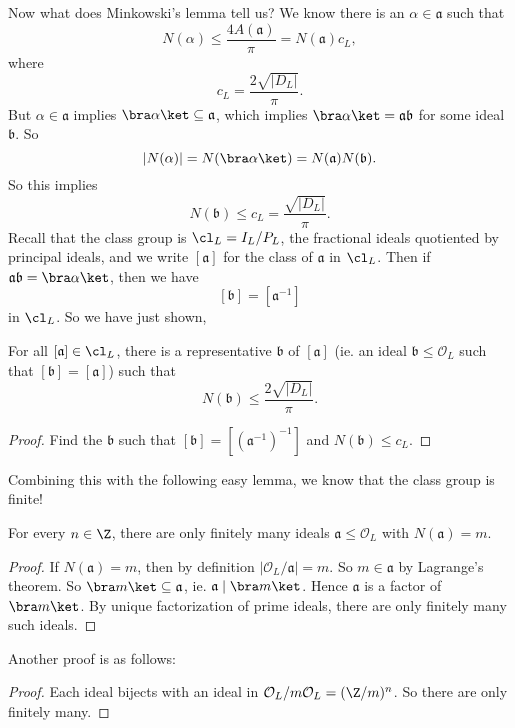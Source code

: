 \documentclass[a4paper]{article}
\begin{document}
Now what does Minkowski's lemma tell us? We know there is an $\alpha \in \mathfrak{a}$ such that
\[
  N(\alpha) \leq \frac{4A(\mathfrak{a})}{\pi} = N(\mathfrak{a}) c_L,
\]
where
\[
  c_L = \frac{2\sqrt{|D_L|}}{\pi}.
\]
But $\alpha \in \mathfrak{a}$ implies $\bra \alpha\ket \subseteq \mathfrak{a}$, which implies $\bra \alpha\ket = \mathfrak{a} \mathfrak{b}$ for some ideal $\mathfrak{b}$. So
\[
  |N(\alpha)| = N(\bra \alpha\ket) = N(\mathfrak{a})N(\mathfrak{b}).
\]
So this implies
\[
  N(\mathfrak{b}) \leq c_L = \frac{\sqrt{|D_L|}}{\pi}.
\]
Recall that the class group is $\cl_L = I_L/P_L$, the fractional ideals quotiented by principal ideals, and we write $[\mathfrak{a}]$ for the class of $\mathfrak{a}$ in $\cl_L$. Then if $\mathfrak{a}\mathfrak{b} = \bra \alpha\ket$, then we have
\[
  [\mathfrak{b}] = [\mathfrak{a}^{-1}]
\]
in $\cl_L$. So we have just shown,
\begin{prop}
  For all $[\mathfrak{a}] \in \cl_L$, there is a representative $\mathfrak{b}$ of $[\mathfrak{a}]$ (ie. an ideal $\mathfrak{b} \leq \mathcal{O}_L$ such that $[\mathfrak{b}] = [\mathfrak{a}]$) such that
  \[
    N(\mathfrak{b}) \leq \frac{2\sqrt{|D_L|}}{\pi}.
  \]
\end{prop}

\begin{proof}
  Find the $\mathfrak{b}$ such that $[\mathfrak{b}] = [(\mathfrak{a}^{-1})^{-1}]$ and $N(\mathfrak{b}) \leq c_L$.
\end{proof}

Combining this with the following easy lemma, we know that the class group is finite!
\begin{lemma}
  For every $n \in \Z$, there are only finitely many ideals $\mathfrak{a} \leq \mathcal{O}_L$ with $N(\mathfrak{a}) = m$.
\end{lemma}

\begin{proof}
  If $N(\mathfrak{a}) = m$, then by definition $|\mathcal{O}_L/\mathfrak{a}| = m$. So $m \in \mathfrak{a}$ by Lagrange's theorem. So $\bra m \ket \subseteq \mathfrak{a}$, ie. $\mathfrak{a} \mid \bra m\ket$. Hence $\mathfrak{a}$ is a factor of $\bra m\ket$. By unique factorization of prime ideals, there are only finitely many such ideals.
\end{proof}

Another proof is as follows:
\begin{proof}
  Each ideal bijects with an ideal in $\mathcal{O}_L/m\mathcal{O}_L = (\Z/m)^n$. So there are only finitely many.
\end{proof}
\end{document}
